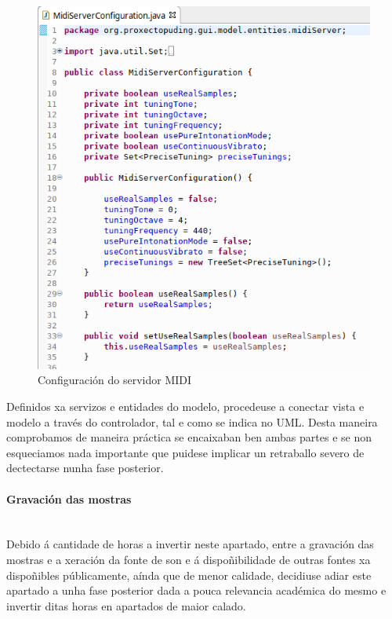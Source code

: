    \begin{figure}[htbp]
    \centering
    \includegraphics[scale=0.6, keepaspectratio=true]{./imagenes/midi-server-configuration.png}
    \caption{Configuración do servidor MIDI}
    \label{figura:MidiServerConfiguration}
   \end{figure}
   
   Definidos xa servizos e entidades do modelo, procedeuse a conectar vista e
   modelo a través do controlador, tal e como se indica no UML. Desta maneira
   comprobamos de maneira práctica se encaixaban ben ambas partes e se non
   esqueciamos nada importante que puidese implicar un retraballo severo de
   dectectarse nunha fase posterior.

   \paragraph{Gravación das mostras}\mbox{}\\
   
   Debido á cantidade de horas a invertir neste apartado, entre a gravación das
   mostras e a xeración da fonte de son e á dispoñibilidade de outras fontes xa
   dispoñibles públicamente, aínda que de menor calidade, decidiuse adiar este
   apartado a unha fase posterior dada a pouca relevancia académica do mesmo e
   invertir ditas horas en apartados de maior calado.

